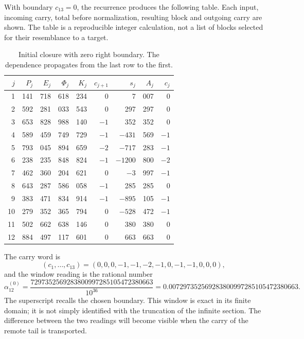 With boundary \(c_{13}=0\), the recurrence produces the following table.
Each input, incoming carry, total before normalization,
resulting block and outgoing carry are shown. The table is a reproducible integer
calculation, not a list of blocks selected for their resemblance to
a target.

\begin{table}[htbp]
\centering
\small
\setlength{\tabcolsep}{3.5pt}
\begin{tabular}{r|rrrr|rr|rr}
\hline
\(j\)&\(P_j\)&\(E_j\)&\(\Phi_j\)&\(K_j\)&\(c_{j+1}\)&\(s_j\)&\(A_j\)&\(c_j\)\\
\hline
1&141&718&618&234&0&7&007&0\\
2&592&281&033&543&0&297&297&0\\
3&653&828&988&140&\(-1\)&352&352&0\\
4&589&459&749&729&\(-1\)&\(-431\)&569&\(-1\)\\
5&793&045&894&659&\(-2\)&\(-717\)&283&\(-1\)\\
6&238&235&848&824&\(-1\)&\(-1200\)&800&\(-2\)\\
7&462&360&204&621&0&\(-3\)&997&\(-1\)\\
8&643&287&586&058&\(-1\)&285&285&0\\
9&383&471&834&914&\(-1\)&\(-895\)&105&\(-1\)\\
10&279&352&365&794&0&\(-528\)&472&\(-1\)\\
11&502&662&638&146&0&380&380&0\\
12&884&497&117&601&0&663&663&0\\
\hline
\end{tabular}
\caption{Initial closure with zero right boundary. The dependence propagates from the last row to the first.}
\label{x_reciprocidad:tab:alpha-ventana}
\end{table}

The carry word is
\[
 (c_1,\ldots,c_{13})=(0,0,0,-1,-1,-2,-1,0,-1,-1,0,0,0),
\]
and the window reading is the rational number
\begin{equation}
 \alpha_{12}^{(0)}
 =\frac{7297352569283800997285105472380663}{10^{36}}
 =0.007297352569283800997285105472380663.
 \label{x_reciprocidad:eq:alpha-ventana-cero}
\end{equation}
The superscript recalls the chosen boundary. This window is exact in its
finite domain; it is not simply identified with the truncation of the
infinite section. The difference between the two readings will become visible when
the carry of the remote tail is transported.

